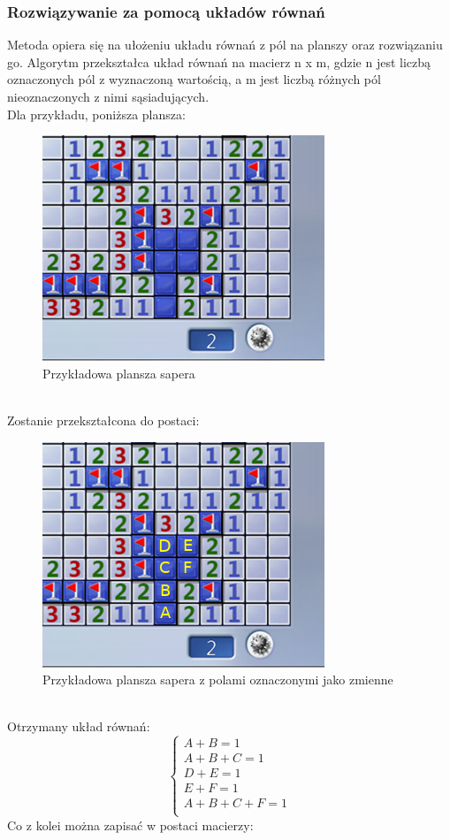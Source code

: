 \documentclass[letterpaper,12pt]{article}
\begin{document}
\subsubsection*{Rozwiązywanie za pomocą układów równań}
Metoda opiera się na ułożeniu układu równań z pól na planszy oraz rozwiązaniu go. 
Algorytm przekształca układ równań na macierz n x m, gdzie n jest liczbą oznaczonych 
pól z wyznaczoną wartością, a m jest liczbą różnych pól nieoznaczonych z nimi sąsiadujących.\\
Dla przykładu, poniższa plansza:
\begin{figure}[h]
    \centering
    \includegraphics[scale=0.5]{matrix_first.png}
    \caption{Przykładowa plansza sapera}
\end{figure} \\
Zostanie przekształcona do postaci:\\
\begin{figure}[h]
    \centering
    \includegraphics[scale=0.5]{matrix_marked.png}
    \caption{Przykładowa plansza sapera z polami oznaczonymi jako zmienne}
\end{figure} \\
Otrzymany układ równań: \\
$$
\begin{cases}
 A + B = 1 \\
 A + B + C = 1 \\
 D + E = 1 \\
 E + F = 1 \\
 A + B + C + F = 1 \\
\end{cases}
$$
\newpage
Co z kolei można zapisać w postaci macierzy: \\
\end{document}
